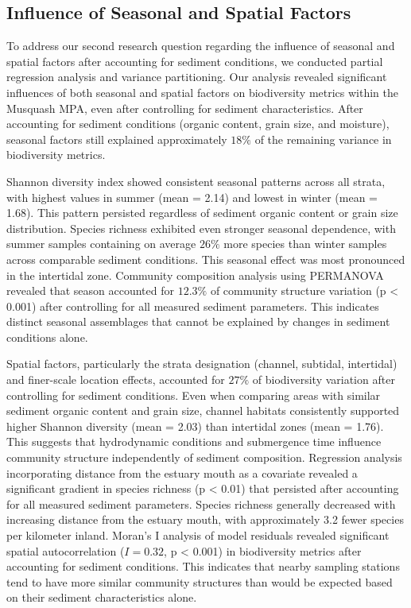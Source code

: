 \documentclass[12pt]{article}
\begin{document}
\subsection{Influence of Seasonal and Spatial Factors}

\qquad To address our second research question regarding the influence of seasonal and spatial factors after accounting for sediment conditions, we conducted partial regression analysis and variance partitioning. Our analysis revealed significant influences of both seasonal and spatial factors on biodiversity metrics within the Musquash MPA, even after controlling for sediment characteristics. After accounting for sediment conditions (organic content, grain size, and moisture), seasonal factors still explained approximately $18\%$ of the remaining variance in biodiversity metrics.

\qquad Shannon diversity index showed consistent seasonal patterns across all strata, with highest values in summer (mean = 2.14) and lowest in winter (mean = 1.68). This pattern persisted regardless of sediment organic content or grain size distribution. Species richness exhibited even stronger seasonal dependence, with summer samples containing on average $26\%$ more species than winter samples across comparable sediment conditions. This seasonal effect was most pronounced in the intertidal zone. Community composition analysis using PERMANOVA revealed that season accounted for $12.3\%$ of community structure variation (p < 0.001) after controlling for all measured sediment parameters. This indicates distinct seasonal assemblages that cannot be explained by changes in sediment conditions alone.

\qquad Spatial factors, particularly the strata designation (channel, subtidal, intertidal) and finer-scale location effects, accounted for $27\%$ of biodiversity variation after controlling for sediment conditions. Even when comparing areas with similar sediment organic content and grain size, channel habitats consistently supported higher Shannon diversity (mean = 2.03) than intertidal zones (mean = 1.76). This suggests that hydrodynamic conditions and submergence time influence community structure independently of sediment composition. Regression analysis incorporating distance from the estuary mouth as a covariate revealed a significant gradient in species richness (p < 0.01) that persisted after accounting for all measured sediment parameters. Species richness generally decreased with increasing distance from the estuary mouth, with approximately 3.2 fewer species per kilometer inland. Moran's I analysis of model residuals revealed significant spatial autocorrelation ($I = 0.32$, p < 0.001) in biodiversity metrics after accounting for sediment conditions. This indicates that nearby sampling stations tend to have more similar community structures than would be expected based on their sediment characteristics alone.
\end{document}
